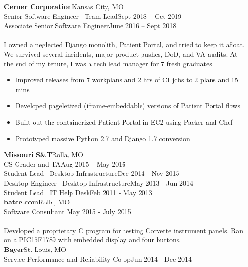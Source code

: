 \documentclass[margin]{res}
\begin{document}
\begin{resume}
       \textbf{Cerner Corporation}\hfill Kansas City, MO\\
         Senior Software Engineer \textbar \ Team Lead\hfill Sept 2018 -- Oct 2019 \\
         Associate Senior Software Engineer\hfill June 2016 -- Sept 2018 \\
         \\
         I owned a neglected Django monolith, Patient Portal, and tried to keep it afloat. We survived several incidents, major product pushes,
         DoD, and VA audits. At the end of my tenure, I was a tech lead manager for 7 fresh graduates. \\

         \begin{itemize} \itemsep -1pt  %
           \item Improved releases from 7 workplans and 2 hrs of CI jobs to 2 plans and 15 mins
           \item Developed pageletized (iframe-embeddable) versions of Patient Portal flows
           \item Built out the containerized Patient Portal in EC2 using Packer and Chef
           \item Prototyped massive Python 2.7 and Django 1.7 conversion
         \end{itemize}

    \textbf{Missouri S\&T}\hfill Rolla, MO\\
      CS Grader and TA\hfill Aug 2015 -- May 2016\\
      Student Lead \textbar \ Desktop Infrastructure\hfill Dec 2014 - Nov 2015\\
      Desktop Engineer \textbar \ Desktop Infrastructure\hfill May 2013 - Jun 2014\\
      Student Lead \textbar \ IT Help Desk\hfill Feb 2011 - May 2013\\

    \textbf{batee.com}\hfill Rolla, MO\\
      Software Consultant \hfill May 2015 - July 2015\\
      \\
      Developed a proprietary C program for testing Corvette instrument panels. Ran on a PIC16F1789 with embedded display and four buttons.\\

    \textbf{Bayer}\hfill St. Louis, MO\\
      Service Performance and Reliability Co-op\hfill Jun 2014 - Dec 2014\\




\end{resume}
\end{document}
